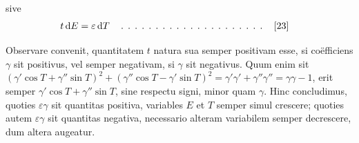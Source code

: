 sive
\[
\begin{aligned}
&t\,\mathrm dE{}=\varepsilon\,\mathrm dT\quad
\mathinner{\ldotp\;\ldotp\;\ldotp\;\ldotp\;\ldotp\;\ldotp\;\ldotp\;\ldotp\;\ldotp\;\ldotp\;\ldotp\;\ldotp\;\ldotp\;\ldotp\;\ldotp\;\ldotp\;\ldotp\;\ldotp\;\ldotp\;\ldotp\;\ldotp}\quad[23]
\end{aligned}
\]
\par Observare convenit, quantitatem $t$ natura sua semper positivam esse, si
coëfficiens $\gamma$ sit positivus, vel semper negativam, si $\gamma$ sit negativus. Quum enim
sit $(\gamma'\cos T+\gamma''\sin T)^2+(\gamma''\cos T-\gamma'\sin T)^2=\gamma'\gamma'+\gamma''\gamma''=\gamma\gamma-1$, erit semper
\noindent{}
$\gamma'\cos T+\gamma''\sin T$, sine respectu signi, minor quam $\gamma$. Hinc concludimus, quoties
$\varepsilon\gamma$ sit quantitas positiva, variables $E$ et $T$ semper simul crescere; quoties
autem $\varepsilon\gamma$ sit quantitas negativa, necessario alteram variabilem semper decrescere,
dum altera augeatur.



